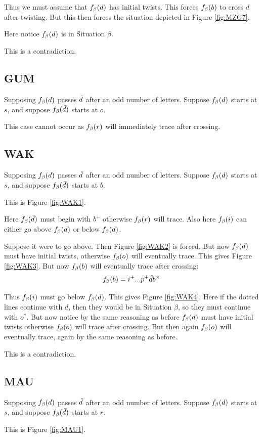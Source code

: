 Thus we must assume that $f_\beta(d)$ has initial twists. This forces $f_\beta(b)$ to cross $d$ after twisting. But this then forces the situation depicted in Figure \ref{fig:MZG7}.

Here notice $f_\beta(d)$ is in Situation $\beta$.

This is a contradiction.


\subsection{GUM}
Supposing $f_\beta(d)$ passes $\bar{d}$ after an odd number of letters. Suppose $f_\beta(d)$ starts at $s$, and suppose $f_\beta(\bar{d})$ starts at $o$.

This case cannot occur as $f_\beta(r)$ will immediately trace after crossing.

\subsection{WAK}\label{WAK}
Supposing $f_\beta(d)$ passes $\bar{d}$ after an odd number of letters. Suppose $f_\beta(d)$ starts at $s$, and suppose $f_\beta(\bar{d})$ starts at $b$.

This is Figure \ref{fig:WAK1}.

Here $f_\beta(\bar{d})$ must begin with $b^+$ otherwise $f_\beta(r)$ will trace. Also here $f_\beta(i)$ can either go above $f_\beta(d)$ or below $f_\beta(d)$. 

Suppose it were to go above. Then Figure \ref{fig:WAK2} is forced. But now $f_\beta(d)$ must have initial twists, otherwise $f_\beta(o)$ will eventually trace. This gives Figure \ref{fig:WAK3}. But now $f_\beta(b)$ will eventually trace after crossing:
\[
f_\beta(b) = i^+...p^+ \bar{d} b^\times
\]

Thus $f_\beta(i)$ must go below $f_\beta(d)$. This gives Figure \ref{fig:WAK4}. Here if the dotted lines continue with $d$, then they would be in Situation $\beta$, so they must continue with $o^*$. But now notice by the same reasoning as before $f_\beta(d)$ must have initial twists otherwise $f_\beta(o)$ will trace after crossing. But then again $f_\beta(o)$ will eventually trace, again by the same reasoning as before.

This is a contradiction.

\subsection{MAU}\label{MAU}
Supposing $f_\beta(d)$ passes $\bar{d}$ after an odd number of letters. Suppose $f_\beta(d)$ starts at $s$, and suppose $f_\beta(\bar{d})$ starts at $r$.

This is Figure \ref{fig:MAU1}.

